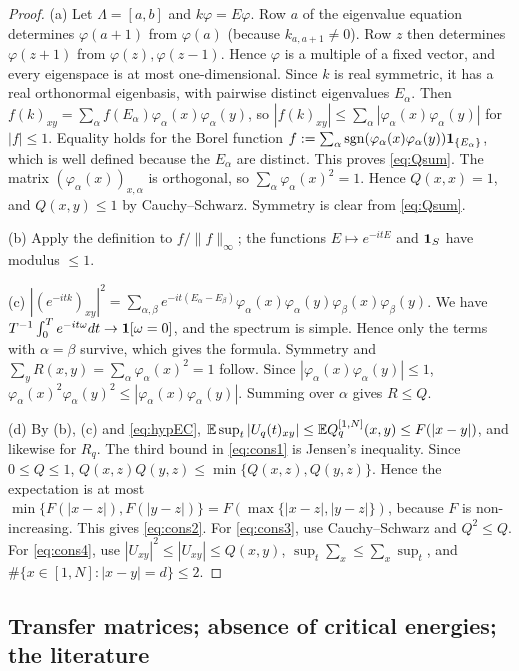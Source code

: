 \begin{proof}
(a) Let $\Lambda=[a,b]$ and $k\varphi=E\varphi$.  Row $a$ of the eigenvalue equation determines
$\varphi(a+1)$ from $\varphi(a)$ (because $k_{a,a+1}\neq0$).  Row $z$ then determines $\varphi(z+1)$ from
$\varphi(z),\varphi(z-1)$.  Hence $\varphi$ is a multiple of a fixed vector, and every eigenspace is at
most one-dimensional.  Since $k$ is real symmetric, it has a real orthonormal eigenbasis, with pairwise
distinct eigenvalues $E_\alpha$.  Then $f(k)_{xy}=\sum_\alpha f(E_\alpha)\varphi_\alpha(x)\varphi_\alpha(y)$, so
$|f(k)_{xy}|\le\sum_\alpha|\varphi_\alpha(x)\varphi_\alpha(y)|$ for $|f|\le1$.  Equality holds for the Borel
function $f:=\sum_\alpha\operatorname{sgn}(\varphi_\alpha(x)\varphi_\alpha(y))\mathbf{1}_{\{E_\alpha\}}$, which is well defined
because the $E_\alpha$ are distinct.  This proves \eqref{eq:Qsum}.  The matrix
$(\varphi_\alpha(x))_{x,\alpha}$ is orthogonal, so $\sum_\alpha\varphi_\alpha(x)^2=1$.  Hence $Q(x,x)=1$, and
$Q(x,y)\le1$ by Cauchy--Schwarz.  Symmetry is clear from \eqref{eq:Qsum}.

(b) Apply the definition to $f/\|f\|_\infty$; the functions $E\mapsto e^{-itE}$ and $\mathbf{1}_S$ have modulus $\le1$.

(c) $|(e^{-itk})_{xy}|^2=\sum_{\alpha,\beta}e^{-it(E_\alpha-E_\beta)}\varphi_\alpha(x)\varphi_\alpha(y)\varphi_\beta(x)\varphi_\beta(y)$.
We have $T^{-1}\int_0^Te^{-it\omega}dt\to\mathbf{1}[\omega=0]$, and the spectrum is simple.  Hence only the
terms with $\alpha=\beta$ survive, which gives the formula.  Symmetry and $\sum_yR(x,y)=\sum_\alpha\varphi_\alpha(x)^2=1$
follow.  Since $|\varphi_\alpha(x)\varphi_\alpha(y)|\le1$, $\varphi_\alpha(x)^2\varphi_\alpha(y)^2\le|\varphi_\alpha(x)\varphi_\alpha(y)|$.
Summing over $\alpha$ gives $R\le Q$.

(d) By (b), (c) and \eqref{eq:hypEC}, $\mathbb{E}\sup_t|U_q(t)_{xy}|\le\mathbb{E} Q^{[1,N]}_q(x,y)\le F(|x-y|)$, and
likewise for $R_q$.  The third bound in \eqref{eq:cons1} is Jensen's inequality.  Since
$0\le Q\le1$, $Q(x,z)Q(y,z)\le\min\{Q(x,z),Q(y,z)\}$.  Hence the expectation is at most
$\min\{F(|x-z|),F(|y-z|)\}=F(\max\{|x-z|,|y-z|\})$, because $F$ is non-increasing.  This gives
\eqref{eq:cons2}.  For \eqref{eq:cons3}, use Cauchy--Schwarz and $Q^2\le Q$.  For \eqref{eq:cons4},
use $|U_{xy}|^2\le|U_{xy}|\le Q(x,y)$, $\sup_t\sum_x\le\sum_x\sup_t$, and
$\#\{x\in[1,N]:|x-y|=d\}\le2$.
\end{proof}

\subsection{Transfer matrices; absence of critical energies; the literature}\label{sec:onebody:lit}

